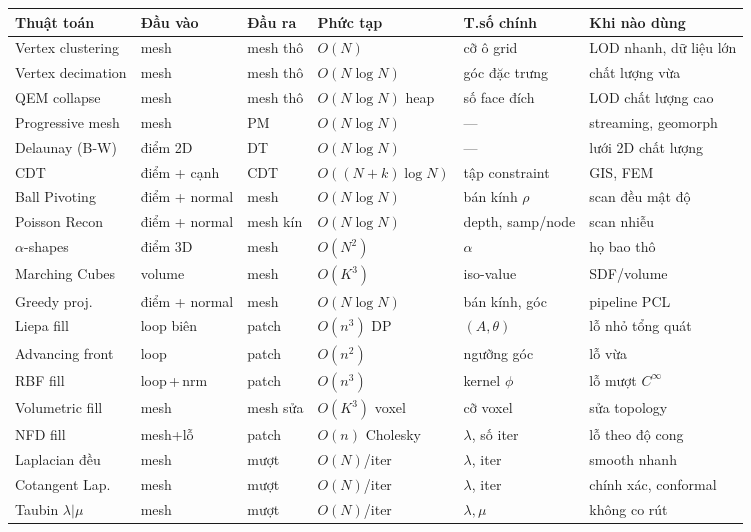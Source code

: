 \begin{paracol}{2}
\scriptsize
\setlength{\tabcolsep}{2pt}
\begin{tabular}{@{}p{2.4cm}p{1.4cm}p{1.5cm}p{1.5cm}p{1.9cm}p{2.2cm}@{}}
\toprule
\textbf{Thuật toán} & \textbf{Đầu vào} & \textbf{Đầu ra} & \textbf{Phức tạp} & \textbf{T.số chính} & \textbf{Khi nào dùng} \\
\midrule
Vertex clustering & mesh & mesh thô & $O(N)$ & cỡ ô grid & LOD nhanh, dữ liệu lớn \\
Vertex decimation & mesh & mesh thô & $O(N\log N)$ & góc đặc trưng & chất lượng vừa \\
QEM collapse & mesh & mesh thô & $O(N\log N)$ heap & số face đích & LOD chất lượng cao \\
Progressive mesh & mesh & PM & $O(N\log N)$ & — & streaming, geomorph \\
Delaunay (B-W) & điểm 2D & DT & $O(N\log N)$ & — & lưới 2D chất lượng \\
CDT & điểm + cạnh & CDT & $O((N+k)\log N)$ & tập constraint & GIS, FEM \\
Ball Pivoting & điểm + normal & mesh & $O(N\log N)$ & bán kính $\rho$ & scan đều mật độ \\
Poisson Recon & điểm + normal & mesh kín & $O(N\log N)$ & depth, samp/node & scan nhiễu \\
$\alpha$-shapes & điểm 3D & mesh & $O(N^2)$ & $\alpha$ & họ bao thô \\
Marching Cubes & volume & mesh & $O(K^3)$ & iso-value & SDF/volume \\
Greedy proj. & điểm + normal & mesh & $O(N\log N)$ & bán kính, góc & pipeline PCL \\
Liepa fill & loop biên & patch & $O(n^3)$ DP & $(A,\theta)$ & lỗ nhỏ tổng quát \\
Advancing front & loop & patch & $O(n^2)$ & ngưỡng góc & lỗ vừa \\
RBF fill & loop\,+\,nrm & patch & $O(n^3)$ & kernel $\phi$ & lỗ mượt $C^\infty$ \\
Volumetric fill & mesh & mesh sửa & $O(K^3)$ voxel & cỡ voxel & sửa topology \\
NFD fill & mesh+lỗ & patch & $O(n)$ Cholesky & $\lambda$, số iter & lỗ theo độ cong \\
Laplacian đều & mesh & mượt & $O(N)$/iter & $\lambda$, iter & smooth nhanh \\
Cotangent Lap. & mesh & mượt & $O(N)$/iter & $\lambda$, iter & chính xác, conformal \\
Taubin $\lambda|\mu$ & mesh & mượt & $O(N)$/iter & $\lambda,\mu$ & không co rút \\

\end{tabular}
\end{paracol}
